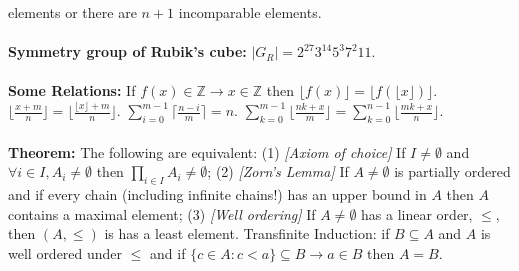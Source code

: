 elements or there are $n+1$ incomparable elements.  
\\
\\
{\bf Symmetry group of Rubik's cube:} $|G_R|= 2^{27}3^{14}5^3 7^2 11$.
\\
\\
{\bf Some Relations:}
If $f(x) \in {\mathbb Z} \rightarrow x \in {\mathbb Z}$ then
$\lfloor f(x) \rfloor = \lfloor f(\lfloor x \rfloor) \rfloor$.
$\lfloor {\frac {x+m} n} \rfloor=
\lfloor {\frac {\lfloor x \rfloor + m} n} \rfloor$.
$\sum_{i=0}^{m-1} \lceil {\frac {n-i} m} \rceil= n$.
$ \sum_{k=0}^{m-1} \lfloor {\frac {nk+x} m} \rfloor=
\sum_{k=0}^{n-1} \lfloor {\frac {mk+x} n} \rfloor$.
\\
\\
{\bf Theorem:}
The following are equivalent: (1) \emph{[Axiom of choice]}  If $I \ne \emptyset$ and
$\forall i \in I, A_i \ne \emptyset$ then $\prod_{i \in I} A_i \ne \emptyset$;
(2) \emph{[Zorn's Lemma]} If $A \ne \emptyset$ is partially ordered and if every chain
(including infinite chains!) has an upper bound in $A$ then $A$ contains a
maximal element; (3) \emph{[Well ordering]}  If $A \ne \emptyset$ has a linear order,
$\le$, then $(A, \le)$ is has a least element.  Transfinite Induction: if
$B \subseteq A$ and $A$ is well ordered under $\le$ and if 
$\{ c \in A: c<a \} \subseteq B \rightarrow a \in B$ then $A=B$.
